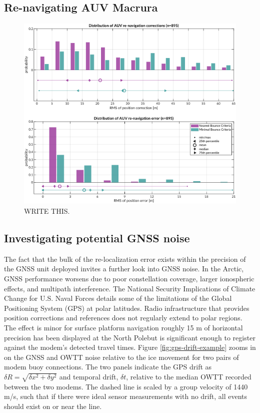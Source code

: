 \subsection{Re-navigating AUV Macrura}

\begin{figure}[!ht]
\includegraphics[width=\textwidth]{figs/auv-trilat-stat.pdf}
\caption{WRITE THIS.}
\label{fig:trilat-auv}
\end{figure}


\subsection{Investigating potential GNSS noise}

The fact that the bulk of the re-localization error exists within the precision of the GNSS unit deployed invites a further look into GNSS noise.
In the Arctic, GNSS performance worsens due to poor constellation coverage, larger ionospheric effects, and multipath interference.
The National Security Implications of Climate Change for U.S. Naval Forces \citep{NAP12914} details some of the limitations of the Global Positioning System (GPS) at polar latitudes.
Radio infrastructure that provides position corrections and references does not regularly extend to polar regions.
The effect is minor for surface platform navigation \textemdash roughly 15 m of horizontal precision has been displayed at the North Pole\textemdash but is significant enough to register against the modem's detected travel times.
Figure \ref{fig:gps-drift-example} zooms in on the GNSS and OWTT noise relative to the ice movement for two pairs of modem buoy connections.
The two panels indicate the GPS drift as $\delta R = \sqrt{\delta x^2 + \delta y^2}$ and temporal drift, $\delta t$, relative to the median OWTT recorded between the two modems.
The dashed line is scaled by a group velocity of 1440 m/s, such that if there were ideal sensor measurements with no drift, all events should exist on or near the line.

